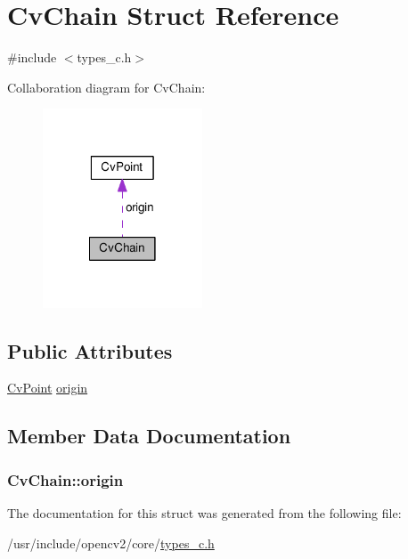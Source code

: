 \hypertarget{structCvChain}{\section{Cv\-Chain Struct Reference}
\label{structCvChain}
}


{\ttfamily \#include $<$types\-\_\-c.\-h$>$}



Collaboration diagram for Cv\-Chain\-:\nopagebreak
\begin{figure}[H]
\begin{center}
\leavevmode
\includegraphics[width=134pt]{structCvChain__coll__graph}
\end{center}
\end{figure}
\subsection*{Public Attributes}
\begin{DoxyCompactItemize}
\item 
\hyperlink{structCvPoint}{Cv\-Point} \hyperlink{structCvChain_a307d8ce984bf09d50f9c54ad4e7264b0}{origin}
\end{DoxyCompactItemize}


\subsection{Member Data Documentation}
\hypertarget{structCvChain_a307d8ce984bf09d50f9c54ad4e7264b0}{
\subsubsection[{origin}]{ Cv\-Chain\-::origin}}\label{structCvChain_a307d8ce984bf09d50f9c54ad4e7264b0}


The documentation for this struct was generated from the following file\-:\begin{DoxyCompactItemize}
\item 
/usr/include/opencv2/core/\hyperlink{core_2types__c_8h}{types\-\_\-c.\-h}\end{DoxyCompactItemize}
